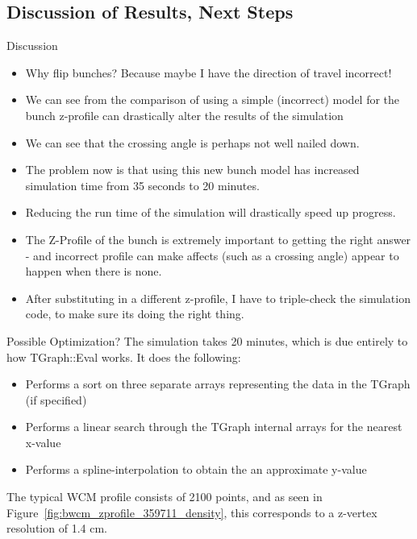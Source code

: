 \subsection{Discussion of Results, Next Steps}

\begin{frame}{Discussion}
\begin{itemize}
\item Why flip bunches? Because maybe I have the direction of travel incorrect!
\item We can see from the comparison of using a simple (incorrect) model for the
	bunch z-profile can drastically alter the results of the simulation
\item We can see that the crossing angle is perhaps not well nailed down.
\item The problem now is that using this new bunch model has increased
	simulation time from 35 seconds to 20 minutes.
\item Reducing the run time of the simulation will drastically speed up
	progress.
\item The Z-Profile of the bunch is extremely important to getting the right
	answer - and incorrect profile can make affects (such as a crossing
	angle) appear to happen when there is none.
\item After substituting in a different z-profile, I have to triple-check the
	simulation code, to make sure its doing the right thing.
\end{itemize}
\end{frame}

\begin{frame}{Possible Optimization?}
The simulation takes 20 minutes, which is due entirely to how TGraph::Eval
works. It does the following:

\begin{itemize}
\item Performs a sort on three separate arrays representing the data in the
	TGraph (if specified) 
\item Performs a linear search through the TGraph internal arrays for the
	nearest x-value 
\item Performs a spline-interpolation to obtain the an approximate y-value
\end{itemize}
The typical WCM profile consists of 2100 points, and as seen in
Figure~\ref{fig:bwcm_zprofile_359711_density}, this corresponds to a z-vertex
resolution of 1.4 cm.
\end{frame}

